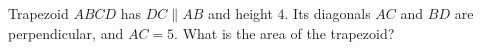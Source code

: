 Trapezoid $ABCD$ has $DC\parallel AB$ and height $4$. Its diagonals $AC$ and $BD$ are perpendicular, and $AC=5$. What is the area of the trapezoid?
